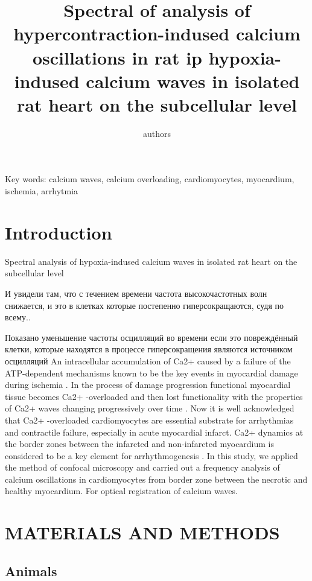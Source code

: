\documentclass[a4paper,12pt]{article}
\title{ Spectral of analysis of hypercontraction-indused calcium oscillations in rat ip hypoxia-indused calcium waves in isolated rat heart on the subcellular level}
\author{authors}
\begin{document}
\maketitle

Key words: calcium waves, calcium overloading, cardiomyocytes, myocardium, ischemia, arrhytmia

\section{Introduction}

Spectral analysis of hypoxia-indused calcium waves in isolated rat heart on the subcellular level

И увидели там, что с течением времени частота высокочастотных волн снижается, и это в клетках которые постепенно гиперсокращаются, судя по всему..

Показано уменьшение частоты осцилляций во времени
если это повреждённый клетки, которые находятся в процессе гиперсокращения
являются источником осцилляций
An intracellular accumulation of Ca2+ caused by a failure of the ATP-dependent mechanisms known to be the key events in myocardial damage during ischemia \cite{shen1972myocardial,shen1972kinetics,nayler1981role}.
In the process of damage progression functional myocardial tissue becomes Ca2+ -overloaded and then lost functionality with the properties of Ca2+ waves changing progressively over time \cite{minamikawa1997situ,hama1998real}.
Now it is well acknowledged that Ca2+ -overloaded cardiomyocytes are essential substrate for arrhythmias and contractile failure, especially in acute myocardial infarct.
Ca2+ dynamics at the border zones between the infarcted and non-infarcted myocardium is considered to be a key element for arrhythmogenesis \cite{takamatsu2008arrhythmogenic}.
In this study, we applied the method of confocal microscopy and carried out a frequency analysis of calcium oscillations in cardiomyocytes from border zone between the necrotic and healthy myocardium.
For optical registration of calcium waves.
\cite{matsuura2018intravital}

\section{MATERIALS AND METHODS}
\subsection{Animals}
\end{document}
